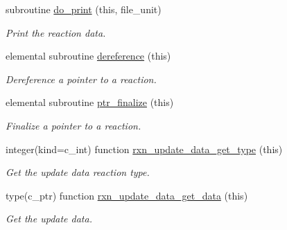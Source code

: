 \begin{DoxyCompactItemize}
subroutine \mbox{\hyperlink{namespacepmc__rxn__data_ae01999e646da4760c3c3f4a9f7a48b59}{do\+\_\+print}} (this, file\+\_\+unit)
\begin{DoxyCompactList}\small\item\em Print the reaction data. \end{DoxyCompactList}\item 
elemental subroutine \mbox{\hyperlink{namespacepmc__rxn__data_a40c9f4798445877bcb9f78ccbbf0d231}{dereference}} (this)
\begin{DoxyCompactList}\small\item\em Dereference a pointer to a reaction. \end{DoxyCompactList}\item 
elemental subroutine \mbox{\hyperlink{namespacepmc__rxn__data_a3115ac7ab9ddc7e122ec1bb8df18500a}{ptr\+\_\+finalize}} (this)
\begin{DoxyCompactList}\small\item\em Finalize a pointer to a reaction. \end{DoxyCompactList}\item 
integer(kind=c\+\_\+int) function \mbox{\hyperlink{namespacepmc__rxn__data_af7376f50bad1c8b21e68568ed7dfdf81}{rxn\+\_\+update\+\_\+data\+\_\+get\+\_\+type}} (this)
\begin{DoxyCompactList}\small\item\em Get the update data reaction type. \end{DoxyCompactList}\item 
type(c\+\_\+ptr) function \mbox{\hyperlink{namespacepmc__rxn__data_a5eb5b555b9ce82e70a70568f33e97b46}{rxn\+\_\+update\+\_\+data\+\_\+get\+\_\+data}} (this)
\begin{DoxyCompactList}\small\item\em Get the update data. \end{DoxyCompactList}\end{DoxyCompactItemize}
